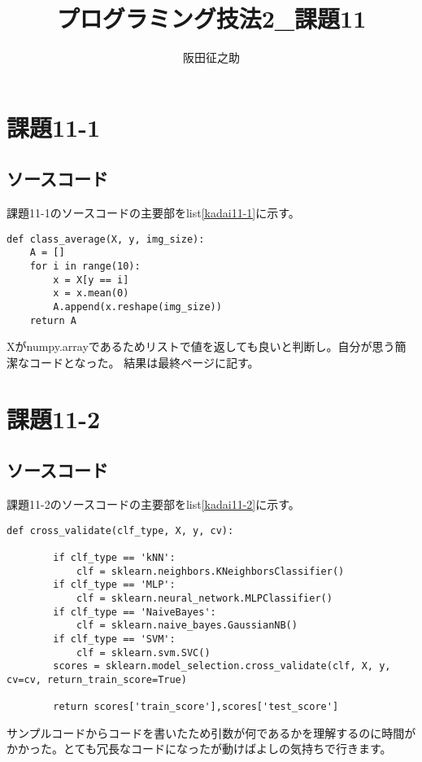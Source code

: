 \documentclass[a4paper]{ltjsarticle}
\begin{document}
\title{プログラミング技法2\_課題11}
\author{阪田征之助}
\maketitle
\newpage
\section*{課題11-1}
\subsection*{ソースコード}
課題11-1のソースコードの主要部をlist\ref{kadai11-1}に示す。

\begin{lstlisting}[caption=kadai11-1.py,label=kadai11-1]
    def class_average(X, y, img_size):
    A = []
    for i in range(10):
        x = X[y == i]
        x = x.mean(0)
        A.append(x.reshape(img_size))
    return A
\end{lstlisting}
Xがnumpy.arrayであるためリストで値を返しても良いと判断し。自分が思う簡潔なコードとなった。
結果は最終ページに記す。

\newpage

\section*{課題11-2}
\subsection*{ソースコード}
課題11-2のソースコードの主要部をlist\ref{kadai11-2}に示す。
\begin{lstlisting}[caption=kadai11-2.py,label=kadai11-2]
    def cross_validate(clf_type, X, y, cv):

        if clf_type == 'kNN':
            clf = sklearn.neighbors.KNeighborsClassifier()
        if clf_type == 'MLP':
            clf = sklearn.neural_network.MLPClassifier()
        if clf_type == 'NaiveBayes':
            clf = sklearn.naive_bayes.GaussianNB()
        if clf_type == 'SVM':
            clf = sklearn.svm.SVC()
        scores = sklearn.model_selection.cross_validate(clf, X, y, cv=cv, return_train_score=True)
    
        return scores['train_score'],scores['test_score']
\end{lstlisting}
サンプルコードからコードを書いたため引数が何であるかを理解するのに時間がかかった。とても冗長なコードになったが動けばよしの気持ちで行きます。
\end{document}
